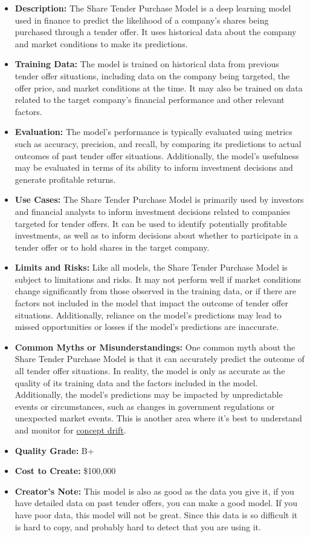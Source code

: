\begin{itemize}
    \item \textbf{Description:} The Share Tender Purchase Model is a deep learning model used in finance to predict the likelihood of a company's shares being purchased through a tender offer. It uses historical data about the company and market conditions to make its predictions.
    \item \textbf{Training Data:} The model is trained on historical data from previous tender offer situations, including data on the company being targeted, the offer price, and market conditions at the time. It may also be trained on data related to the target company's financial performance and other relevant factors.
    \item \textbf{Evaluation:} The model's performance is typically evaluated using metrics such as accuracy, precision, and recall, by comparing its predictions to actual outcomes of past tender offer situations. Additionally, the model's usefulness may be evaluated in terms of its ability to inform investment decisions and generate profitable returns.
    \item \textbf{Use Cases:} The Share Tender Purchase Model is primarily used by investors and financial analysts to inform investment decisions related to companies targeted for tender offers. It can be used to identify potentially profitable investments, as well as to inform decisions about whether to participate in a tender offer or to hold shares in the target company.
    \item \textbf{Limits and Risks:} Like all models, the Share Tender Purchase Model is subject to limitations and risks. It may not perform well if market conditions change significantly from those observed in the training data, or if there are factors not included in the model that impact the outcome of tender offer situations. Additionally, reliance on the model's predictions may lead to missed opportunities or losses if the model's predictions are inaccurate.
    \item \textbf{Common Myths or Misunderstandings:} One common myth about the Share Tender Purchase Model is that it can accurately predict the outcome of all tender offer situations. In reality, the model is only as accurate as the quality of its training data and the factors included in the model. Additionally, the model's predictions may be impacted by unpredictable events or circumstances, such as changes in government regulations or unexpected market events. This is another area where it's best to understand and monitor for \hyperref[sec:drift]{concept drift}.
    \item \textbf{Quality Grade:} B+
    \item \textbf{Cost to Create:} \$100,000
    \item \textbf{Creator's Note:} This model is also as good as the data you give it, if you have detailed data on past tender offers, you can make a good model. If you have poor data, this model will not be great. Since this data is so difficult it is hard to copy, and probably hard to detect that you are using it.
\end{itemize}

